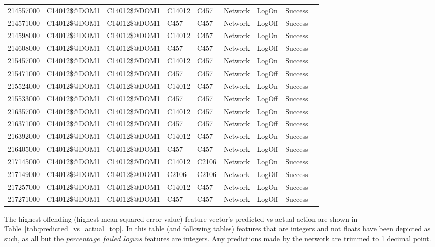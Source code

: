 \begin{table}[htbp]
{\begin{tabular}{lllllllll}
			214557000 & C14012\$@DOM1 & C14012\$@DOM1 & C14012 & C457 & Network & LogOn & Success \\
			214571000 & C14012\$@DOM1 & C14012\$@DOM1 & C457 & C457 & Network & LogOff & Success \\
			214598000 & C14012\$@DOM1 & C14012\$@DOM1 & C14012 & C457 & Network & LogOn & Success \\
			214608000 & C14012\$@DOM1 & C14012\$@DOM1 & C457 & C457 & Network & LogOff & Success \\
			215457000 & C14012\$@DOM1 & C14012\$@DOM1 & C14012 & C457 & Network & LogOn & Success \\
			215471000 & C14012\$@DOM1 & C14012\$@DOM1 & C457 & C457 & Network & LogOff & Success \\
			215524000 & C14012\$@DOM1 & C14012\$@DOM1 & C14012 & C457 & Network & LogOn & Success \\
			215533000 & C14012\$@DOM1 & C14012\$@DOM1 & C457 & C457 & Network & LogOff & Success \\
			216357000 & C14012\$@DOM1 & C14012\$@DOM1 & C14012 & C457 & Network & LogOn & Success \\
			216371000 & C14012\$@DOM1 & C14012\$@DOM1 & C457 & C457 & Network & LogOff & Success \\
			216392000 & C14012\$@DOM1 & C14012\$@DOM1 & C14012 & C457 & Network & LogOn & Success \\
			216405000 & C14012\$@DOM1 & C14012\$@DOM1 & C457 & C457 & Network & LogOff & Success \\
			217145000 & C14012\$@DOM1 & C14012\$@DOM1 & C14012 & C2106 & Network & LogOn & Success \\
			217149000 & C14012\$@DOM1 & C14012\$@DOM1 & C2106 & C2106 & Network & LogOff & Success \\
			217257000 & C14012\$@DOM1 & C14012\$@DOM1 & C14012 & C457 & Network & LogOn & Success \\
			217271000 & C14012\$@DOM1 & C14012\$@DOM1 & C457 & C457 & Network & LogOff & Success
		\end{tabular}
	}
\end{table}

The highest offending (highest mean squared error value) feature vector's predicted vs actual action are shown in Table~\ref{tab:predicted_vs_actual_top}. In this table (and following tables) features that are integers and not floats have been depicted as such, as all but the \(percentage\_failed\_logins\) features are integers. Any predictions made by the network are trimmed to 1 decimal point.

